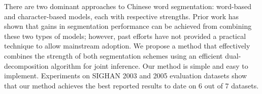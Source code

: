 There are two dominant approaches to Chinese word segmentation: word-based and character-based models, each with respective strengths. Prior work has shown that gains in segmentation performance can be achieved from combining these two types of models; however, past efforts have not provided a practical technique to allow mainstream adoption. We propose a method that effectively combines the strength of both segmentation schemes using an efficient dual-decomposition algorithm for joint inference. Our method is simple and easy to implement. Experiments on SIGHAN 2003 and 2005 evaluation datasets show that our method achieves the best reported results to date on 6 out of 7 datasets.
